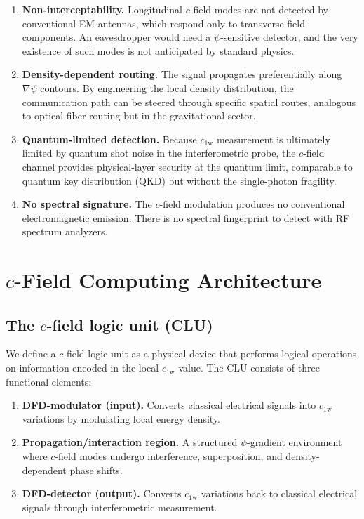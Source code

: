 \documentclass[aps,prd,twocolumn,superscriptaddress,nofootinbib,floatfix]{revtex4-2}
\newcommand{\psifield}{\psi}
\newcommand{\cfield}{c_{\text{1w}}}
\begin{document}
\begin{enumerate}
\item \textbf{Non-interceptability.} Longitudinal $c$-field
modes are not detected by conventional EM antennas, which respond
only to transverse field components. An eavesdropper would need a
$\psifield$-sensitive detector, and the very existence of such
modes is not anticipated by standard physics.

\item \textbf{Density-dependent routing.} The signal propagates
preferentially along $\nabla\psifield$ contours. By engineering
the local density distribution, the communication path can be
steered through specific spatial routes, analogous to optical-fiber
routing but in the gravitational sector.

\item \textbf{Quantum-limited detection.} Because $\cfield$
measurement is ultimately limited by quantum shot noise in the
interferometric probe, the $c$-field channel provides physical-layer
security at the quantum limit, comparable to quantum key distribution
(QKD) but without the single-photon fragility.

\item \textbf{No spectral signature.} The $c$-field modulation
produces no conventional electromagnetic emission. There is no
spectral fingerprint to detect with RF spectrum analyzers.
\end{enumerate}

\section{$c$-Field Computing Architecture}
\label{sec:computing}

\subsection{The $c$-field logic unit (CLU)}

We define a $c$-field logic unit as a physical device that performs
logical operations on information encoded in the local $\cfield$
value. The CLU consists of three functional elements:

\begin{enumerate}
\item \textbf{DFD-modulator (input).} Converts classical electrical
signals into $\cfield$ variations by modulating local energy density.

\item \textbf{Propagation/interaction region.} A structured
$\psifield$-gradient environment where $c$-field modes undergo
interference, superposition, and density-dependent phase shifts.

\item \textbf{DFD-detector (output).} Converts $\cfield$
variations back to classical electrical signals through
interferometric measurement.
\end{enumerate}
\end{document}

